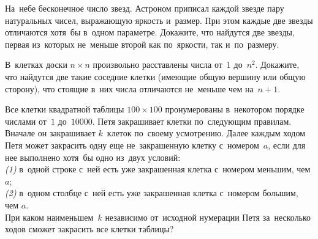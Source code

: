 \begin{problems}
\item
На~небе бесконечное число звезд.
Астроном приписал каждой звезде пару натуральных чисел, выражающую яркость
и~размер.
При этом каждые две звезды отличаются хотя~бы в~одном параметре.
Докажите, что найдутся две звезды, первая из~которых не~меньше второй как
по~яркости, так и~по~размеру.

\item
В~клетках доски $n \times n$ произвольно расставлены числа от~$1$ до~$n^2$.
Докажите, что найдутся две такие соседние клетки (имеющие общую вершину или
общую сторону), что стоящие в~них числа отличаются не~меньше чем на~$n + 1$.

\item
Все клетки квадратной таблицы $100 \times 100$ пронумерованы в~некотором
порядке числами от~$1$ до~$10000$.
Петя закрашивает клетки по~следующим правилам.
Вначале он закрашивает $k$~клеток по~своему усмотрению.
Далее каждым ходом Петя может закрасить одну еще не~закрашенную клетку
с~номером~$a$, если для нее выполнено хотя~бы одно из~двух условий:
\\
\emph{(1)}
в~одной строке с~ней есть уже закрашенная клетка с~номером меньшим, чем $a$;
\\
\emph{(2)}
в~одном столбце с~ней есть уже закрашенная клетка с~номером большим, чем $a$.
\\
При каком наименьшем~$k$ независимо от~исходной нумерации Петя за~несколько
ходов сможет закрасить все клетки таблицы?

\end{problems}

